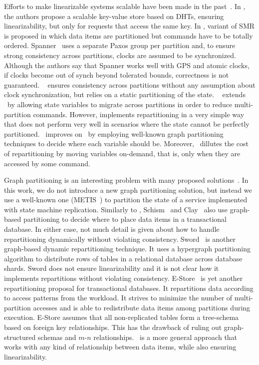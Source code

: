 Efforts to make linearizable systems scalable have been made in the past~\cite{bezerra2014ssmr, corbett2013spanner, Glendenning2011, hoang2016, Marandi:2011dj}.
In \cite{Glendenning2011}, the authors propose a scalable key-value store based on DHTs, ensuring linearizability, but only for requests that access the same key. 
In \cite{Marandi:2011dj}, variant of SMR is proposed in which data items are partitioned but commands have to be totally ordered.
Spanner~\cite{corbett2013spanner} uses a separate Paxos group per partition and, to ensure strong consistency across partitions, clocks are assumed to be synchronized.
Although the authors say that Spanner works well with GPS and atomic clocks, if clocks become out of synch beyond tolerated bounds, correctness is not guaranteed.
\ssmr{}~\cite{bezerra2014ssmr} ensures consistency across partitions without any assumption about clock synchronization, but relies on a static partitioning of the state.
\dssmr{}~\cite{hoang2016} extends \ssmr\ by allowing state variables to migrate across partitions in order to reduce multi-partition commands.
However, \dssmr{} implements repartitioning in a very simple way that does not perform very well in scenarios where the state cannot be perfectly partitioned.
\dynastar\ improves on \dssmr\ by employing well-known graph partitioning techniques to decide where each variable should be.
Moreover, \dynastar\ dillutes the cost of repartitioning by moving variables on-demand, that is, only when they are accessed by some command.

Graph partitioning is an interesting problem with many proposed solutions~\cite{Abou-Rjeili:2006,hendrickson2000graph,kernighan1970efficient}.
In this work, we do not introduce a new graph partitioning solution, but instead we use a well-known one (METIS~\cite{Abou-Rjeili:2006}) to partition the state of a service implemented with state machine replication.
Similarly to \dynastar{}, Schism~\cite{curino2010sch} and Clay~\cite{SerafiniTEPAS16} also use graph-based partitioning to decide where to place data items in a transactional database.
In either case, not much detail is given about how to handle repartitioning dynamically without violating consistency.
Sword~\cite{quamar2013sword} is another graph-based dynamic repartitioning technique.
It uses a hypergraph partitioning algorithm to distribute rows of tables in a relational database across database shards.
Sword does not ensure linearizability and it is not clear how it implements repartitions without violating consistency.
E-Store~\cite{taft2014est} is yet another repartitioning proposal for transactional databases.
It repartitions data according to access patterns from the workload.
It strives to minimize the number of multi-partition accesses and is able to redistribute data items among partitions during execution.
E-Store assumes that all non-replicated tables form a tree-schema based on foreign key relationships.
This has the drawback of ruling out graph-structured schemas and \mbox{$m$-$n$} relationships.
\dynastar\ is a more general approach that works with any kind of relationship between data items, while also ensuring linearizability.

